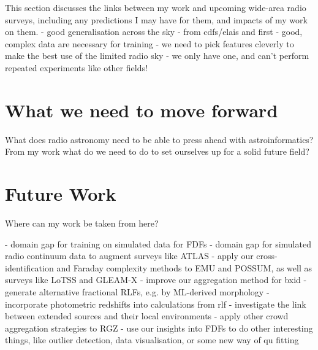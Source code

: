     This section discusses the links between my work and upcoming wide-area radio surveys, including any predictions I may have for them, and impacts of my work on them.
    - good generalisation across the sky - from cdfs/elais and first
    - good, complex data are necessary for training
    - we need to pick features cleverly to make the best use of the limited radio sky - we only have one, and can't perform repeated experiments like other fields!

\section{What we need to move forward}
\label{sec:moving-forward}
    
    What does radio astronomy need to be able to press ahead with astroinformatics? From my work what do we need to do to set ourselves up for a solid future field?

\section{Future Work}
\label{sec:future}

    Where can my work be taken from here?

    - domain gap for training on simulated data for FDFs
    - domain gap for simulated radio continuum data to augment surveys like ATLAS
    - apply our cross-identification and Faraday complexity methods to EMU and POSSUM, as well as surveys like LoTSS and GLEAM-X
    - improve our aggregation method for bxid
    - generate alternative fractional RLFs, e.g. by ML-derived morphology
    - incorporate photometric redshifts into calculations from rlf
    - investigate the link between extended sources and their local environments
    - apply other crowd aggregation strategies to RGZ
    - use our insights into FDFs to do other interesting things, like outlier detection, data visualisation, or some new way of qu fitting
